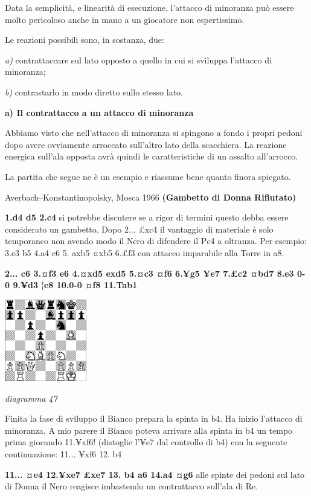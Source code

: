 \documentclass[
]{article}
\begin{document}
Data la semplicità, e linearità di esecuzione, l'attacco di minoranza
può essere molto pericoloso anche in mano a un giocatore non
espertissimo.

Le reazioni possibili sono, in sostanza, due:

\emph{a)} contrattaccare sul lato opposto a quello in cui si sviluppa
l'attacco di minoranza;

\emph{b)} contrastarlo in modo diretto sullo stesso lato.

\textbf{a) Il contrattacco a un attacco di minoranza}

Abbiamo visto che nell'attacco di minoranza si spingono a fondo i propri
pedoni dopo avere ovviamente arroccato sull'altro lato della scacchiera.
La reazione energica sull'ala opposta avrà quindi le caratteristiche di
un assalto all'arrocco.

La partita che segue ne è un esempio e riassume bene quanto finora
spiegato.

Averbach--Konstantinopolsky, Mosca 1966 \textbf{(Gambetto di Donna
Rifiutato)}

\textbf{1.d4 d5 2.c4} si potrebbe discutere se a rigor di termini questo
debba essere considerato un gambetto. Dopo 2... £xc4 il vantaggio di
materiale è solo temporaneo non avendo modo il Nero di difendere il Pc4
a oltranza. Per esempio: 3.e3 b5 4.a4 c6 5. axb5 ¤xb5 6.£f3 con attacco
imparabile alla Torre in a8.

\textbf{2... c6 3.¤f3 e6 4.¤xd5 exd5 5.¤c3 ¤f6 6.¥g5 ¥e7 7.£c2 ¤bd7 8.e3
0-0 9.¥d3 ¦e8 10.0-0 ¤f8 11.Tab1}

\includegraphics[width=1.40972in,height=1.40972in]{vertopal_109f12be458a423d8f3cc838880eaea2/media/image47.png}

\emph{diagramma 47}

Finita la fase di sviluppo il Bianco prepara la spinta in b4. Ha inizio
l'attacco di minoranza. A mio parere il Bianco poteva arrivare alla
spinta in b4 un tempo prima giocando 11.¥xf6! (distoglie l'¥e7 dal
controllo di b4) con la seguente continuazione: 11... ¥xf6 12. b4

\textbf{11... ¤e4 12.¥xe7 £xe7 13. b4 a6 14.a4 ¤g6} alle spinte dei
pedoni sul lato di Donna il Nero reagisce imbastendo un contrattacco
sull'ala di Re.
\end{document}
